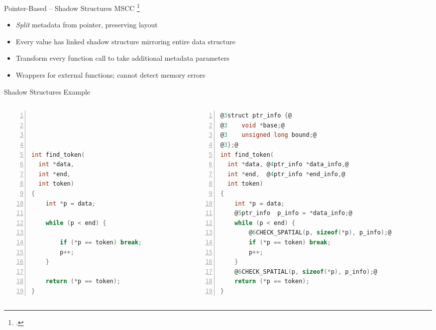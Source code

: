 \documentclass[aspectratio=169]{beamer}
\begin{document}
\begin{frame}{Pointer-Based -- Shadow Structures}
MSCC \footcite{xu_efficient_2004}
\pause
\begin{itemize}
    \item \emph{Split} metadata from pointer, preserving layout 
    \item Every value has linked shadow structure mirroring entire data structure
    \item Transform every function call to take additional metadata parameters
    \item Wrappers for external functions; cannot detect memory errors 
\end{itemize}
\end{frame}

\begin{frame}[fragile]{Shadow Structures Example}
\begin{columns}
\begin{column}{0.42\textwidth}
\begin{lstlisting}[language=C,numbers=left,mathescape,basicstyle={\scriptsize\ttfamily}]




int find_token(
  int *data,
  int *end,
  int token)
{
    int *p = data;

    while (p < end) {

        if (*p == token) break;
        p++;
    }

    return (*p == token);
}
\end{lstlisting}
\end{column}

\pause

\begin{column}{0.56\textwidth}

\begin{lstlisting}[language=C,numbers=left,mathescape,basicstyle={\scriptsize\ttfamily},
    moredelim={**[is][{\btHL<3>}]{@3}{@}},
    moredelim={**[is][{\btHL<4>}]{@4}{@}},
    moredelim={**[is][{\btHL<5>}]{@5}{@}},
    moredelim={**[is][{\btHL<6>}]{@6}{@}},
]
@3struct ptr_info {@
@3    void *base;@
@3    unsigned long bound;@
@3};@
int find_token(
  int *data, @4ptr_info *data_info,@
  int *end,  @4ptr_info *end_info,@
  int token)
{
    int *p = data;
    @5ptr_info  p_info = *data_info;@
    while (p < end) {
        @6CHECK_SPATIAL(p, sizeof(*p), p_info);@
        if (*p == token) break;
        p++;
    }
    @6CHECK_SPATIAL(p, sizeof(*p), p_info);@
    return (*p == token);
}
\end{lstlisting}
    \end{column}
  \end{columns}
\end{frame}
\end{document}
